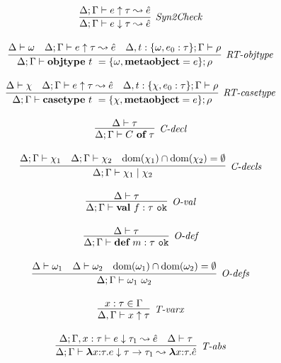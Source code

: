 \begin{figure}
\centering
\[
\begin{array}{c}

\infer[\textit{Syn2Check}]
	{\Delta; \Gamma \vdash  e \downarrow \tau \leadsto \hat{e}} 
	{\Delta;\Gamma \vdash e \uparrow \tau \leadsto \hat{e}   }\\[3ex]

\infer[\textit{RT-objtype}]
	{\Delta; \Gamma \vdash  \keyw{objtype}~ t~=\{{\omega}, \keyw{metaobject}=e\}; \rho} 
	{\Delta \vdash \omega & \Delta; \Gamma \vdash e \uparrow\tau \leadsto \hat{e} & \Delta, t:\{\omega,e_0:\tau\}; \Gamma \vdash \rho }\\[3ex]

\infer[\textit{RT-casetype}]
	{\Delta; \Gamma \vdash  \keyw{casetype}~ t~=\{\chi, \keyw{metaobject}=e\}; \rho} 
	{\Delta \vdash \chi & \Delta; \Gamma \vdash e \uparrow\tau \leadsto \hat{e} & \Delta, t:\{\chi,e_0:\tau\}; \Gamma \vdash \rho  }\\[3ex]

\infer[\textit{C-decl}]
	{\Delta; \Gamma \vdash  C~\keyw{of}~\tau} 
	{\Delta \vdash \tau   }\\[3ex]

\infer[\textit{C-decls}]
	{\Delta; \Gamma \vdash  \chi_1 \bnfalt \chi_2} 
	{\Delta; \Gamma \vdash \chi_1 & \Delta; \Gamma \vdash \chi_2 & \text{dom}(\chi_1) \intersect \text{dom}(\chi_2) = \emptyset}\\[3ex]

\infer[\textit{O-val}]
	{\Delta; \Gamma \vdash \keyw{val}~ f:\tau \ \texttt{ok} }
	{\Delta \vdash \tau} \\[3ex]
	
\infer[\textit{O-def}]
	{\Delta; \Gamma \vdash \keyw{def}~ m:\tau \ \texttt{ok} }
	{\Delta \vdash \tau } \\[3ex]

\infer[\textit{O-defs}]
	{\Delta; \Gamma \vdash \omega_1\ \omega_2  }
	{\Delta \vdash \omega_1 & \Delta \vdash \omega_2 & \text{dom}(\omega_1) \intersect \text{dom}(\omega_2) = \emptyset } \\[3ex]
	
\infer[\textit{T-varx}]
	{\Delta,\Gamma \vdash x\uparrow\tau } 
	{x:\tau \in \Gamma }\\[3ex]

\infer[\textit{T-abs}]
	{\Delta; \Gamma \vdash  \boldsymbol\lambda x{:}\tau . e \downarrow \tau \rightarrow \tau_1 \leadsto \boldsymbol\lambda x{:}\tau .\hat{e}} 
	{\Delta; \Gamma, x:\tau \vdash e\downarrow\tau_1 \leadsto \hat{e}  & \Delta\vdash \tau}\\[3ex]


\end{array}\]
\end{figure}
